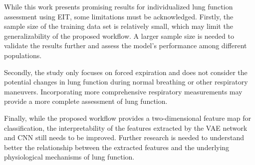 \documentclass[journal,twoside,web]{ieeecolor}
\begin{document}
While this work presents promising results for individualized lung function assessment using EIT, some limitations must be acknowledged. Firstly, the sample size of the training data set is relatively small, which may limit the generalizability of the proposed workflow. A larger sample size is needed to validate the results further and assess the model's performance among different populations.

Secondly, the study only focuses on forced expiration and does not consider the potential changes in lung function during normal breathing or other respiratory maneuvers. Incorporating more comprehensive respiratory measurements may provide a more complete assessment of lung function.

Finally, while the proposed workflow provides a two-dimensional feature map for classification, the interpretability of the features extracted by the VAE network and CNN still needs to be improved. Further research is needed to understand better the relationship between the extracted features and the underlying physiological mechanisms of lung function.



\end{document}
